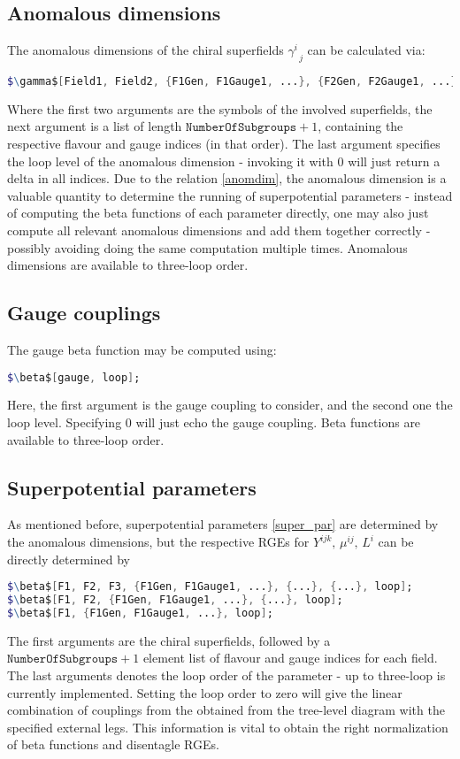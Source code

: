 \documentclass{scrartcl}
\begin{document}
\subsection{Anomalous dimensions}
The anomalous dimensions of the chiral superfields $\gamma^i_{\;\;j}$ can be calculated via:
\begin{lstlisting}[language=mathematica,mathescape,columns=flexible,backgroundcolor=\color{light-gray}]
$\gamma$[Field1, Field2, {F1Gen, F1Gauge1, ...}, {F2Gen, F2Gauge1, ...}, loop];
\end{lstlisting}
Where the first two arguments are the symbols of the involved superfields, the next argument is a list of length $\mathtt{NumberOfSubgroups} + 1$, containing the respective flavour and gauge indices (in that order). The last argument specifies the loop level of the anomalous dimension - invoking it with $0$ will just return a delta in all indices. Due to the relation \ref{anomdim}, the anomalous dimension is a valuable quantity to determine the running of superpotential parameters - instead of computing the beta functions of each parameter directly, one may also just compute all relevant anomalous dimensions and add them together correctly - possibly avoiding doing the same computation multiple times. Anomalous dimensions are available to three-loop order.
\subsection{Gauge couplings}
The gauge beta function may be computed using:
\begin{lstlisting}[language=mathematica,mathescape,columns=flexible,backgroundcolor=\color{light-gray}]
$\beta$[gauge, loop];
\end{lstlisting}
Here, the first argument is the gauge coupling to consider, and the second one the loop level. Specifying $0$ will just echo the gauge coupling. Beta functions are available to three-loop order.
\subsection{Superpotential parameters}
As mentioned before, superpotential parameters \ref{super_par} are determined by the anomalous dimensions, but the respective RGEs for $Y^{ijk},\,\mu^{ij},\,L^i$ can be directly determined by  
\begin{lstlisting}[language=mathematica,mathescape,columns=flexible,backgroundcolor=\color{light-gray}]
$\beta$[F1, F2, F3, {F1Gen, F1Gauge1, ...}, {...}, {...}, loop];
$\beta$[F1, F2, {F1Gen, F1Gauge1, ...}, {...}, loop];
$\beta$[F1, {F1Gen, F1Gauge1, ...}, loop];
\end{lstlisting}
The first arguments are the chiral superfields, followed by a $\mathtt{NumberOfSubgroups} + 1$ element list of flavour and gauge indices for each field. The last arguments denotes the loop order of the parameter - up to three-loop is currently implemented. Setting the loop order to zero will give the linear combination of couplings from the obtained from the tree-level diagram with the specified external legs. This information is vital to obtain the right normalization of beta functions and disentagle RGEs.
\end{document}
